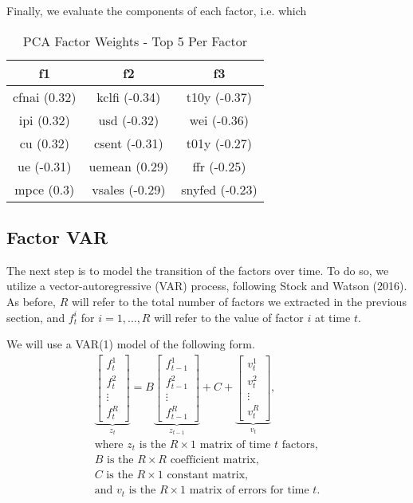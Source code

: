 \documentclass[11pt, letterpaper]{article}\usepackage[]{graphicx}\usepackage[]{color}
\begin{document}
Finally, we evaluate the components of each factor, i.e. which 
\begin{table}[H]
\centering
\begingroup\scriptsize
\begin{tabular}{ccc}
  \hline
f1 & f2 & f3 \\ 
  \hline
cfnai (0.32) & kclfi (-0.34) & t10y (-0.37) \\ 
  ipi (0.32) & usd (-0.32) & wei (-0.36) \\ 
  cu (0.32) & csent (-0.31) & t01y (-0.27) \\ 
  ue (-0.31) & uemean (0.29) & ffr (-0.25) \\ 
  mpce (0.3) & vsales (-0.29) & snyfed (-0.23) \\ 
   \hline
\end{tabular}
\endgroup
\caption{PCA Factor Weights - Top 5 Per Factor} 
\end{table}




\subsection{Factor VAR}
The next step is to model the transition of the factors over time. To do so, we utilize a vector-autoregressive (VAR) process, following Stock and Watson (2016). As before, $R$ will refer to the total number of factors we extracted in the previous section, and $f^i_t$ for $i = 1, \dots, R$ will refer to the value of factor $i$ at time $t$.

We will use a VAR(1) model of the following form.
\begin{align*}
\underbrace{\begin{bmatrix}
	f^1_{t}\\
	f^2_{t}\\
	\vdots \\
	f^R_{t}
\end{bmatrix}}_{z_t}
=
B
\underbrace{\begin{bmatrix}
	f^1_{t-1}\\
	f^2_{t-1}\\
	\vdots \\
	f^R_{t-1}
\end{bmatrix}}_{z_{t-1}}
+
C
+
\underbrace{\begin{bmatrix}
v^1_t\\
v^2_t\\
\vdots\\
v^R_t
\end{bmatrix}}_{v_t},\\
\text{where $z_t$ is the $R \times 1$ matrix of time $t$ factors,}\\
\text{$B$ is the $R \times R$ coefficient matrix,}\\
\text{$C$ is the $R \times 1$ constant matrix,}\\
\text{and $v_t$ is the $R \times 1$ matrix of errors for time $t$.}
\end{align*}
\end{document}
